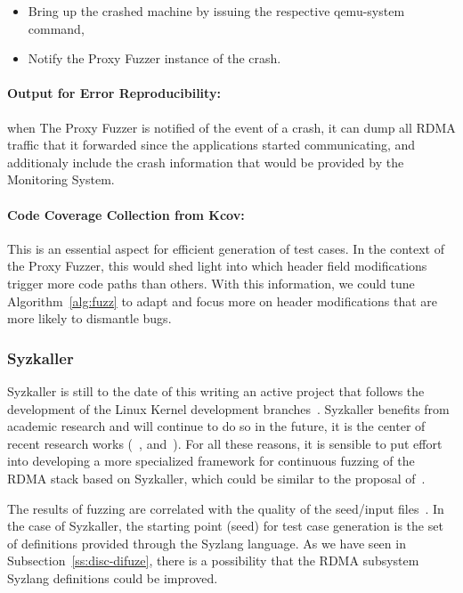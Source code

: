 \begin{itemize}
\item Bring up the crashed machine by issuing the respective qemu-system command,
\item Notify the Proxy Fuzzer instance of the crash.
\end{itemize}

\paragraph{Output for Error Reproducibility:} when The Proxy Fuzzer is notified of the event of a crash, it can dump all
RDMA traffic that it forwarded since the applications started communicating, and additionaly include the crash information
that would be provided by the Monitoring System.

\paragraph{Code Coverage Collection from Kcov:} This is an essential aspect for efficient generation of test cases.
In the context of the Proxy Fuzzer, this would shed light into which header field modifications trigger more
code paths than others. With this information, we could tune Algorithm~\ref{alg:fuzz} to adapt and focus
more on header modifications that are more likely to dismantle bugs.

\subsubsection{Syzkaller}

Syzkaller is still to the date of this writing an active project that follows the development of the Linux Kernel development
branches~\cite{shiIndustryPracticeCoverageguided2019}. Syzkaller benefits from academic
research and will continue to do so in the future, it is the center of recent research works
(~\cite{kim2020hfl},\cite{hongNovelDynamicAnalysis2021} and~\cite{pailoorMoonShineOptimizingOS2018}).
For all these reasons, it is sensible to put effort into developing a more specialized framework for continuous fuzzing
of the RDMA stack based on Syzkaller, which could be similar to the proposal of~\cite{shiIndustryPracticeCoverageguided2019}.


The results of fuzzing are correlated with the quality of the seed/input files~\cite{liangFuzzingStateArt2018}.
In the case of Syzkaller, the starting point (seed) for test case generation is the set of definitions
provided through the Syzlang language. As we have seen in Subsection~\ref{ss:disc-difuze}, there is
a possibility that the RDMA subsystem Syzlang definitions could be improved.
